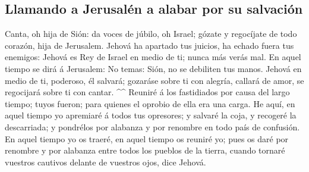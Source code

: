 \hypertarget{llamando-a-jerusaluxe9n-a-alabar-por-su-salvaciuxf3n}{%
\subsection{Llamando a Jerusalén a alabar por su
salvación}\label{llamando-a-jerusaluxe9n-a-alabar-por-su-salvaciuxf3n}}

 Canta, oh hija de Sión: da voces de júbilo, oh Israel;
gózate y regocíjate de todo corazón, hija de Jerusalem. 
Jehová ha apartado tus juicios, ha echado fuera tus enemigos: Jehová es
Rey de Israel en medio de ti; nunca más verás mal.  En
aquel tiempo se dirá á Jerusalem: No temas: Sión, no se debiliten tus
manos.  Jehová en medio de ti, poderoso, él salvará;
gozaráse sobre ti con alegría, callará de amor, se regocijará sobre ti
con cantar. \^{}\^{}  Reuniré á los fastidiados por causa
del largo tiempo; tuyos fueron; para quienes el oprobio de ella era una
carga.  He aquí, en aquel tiempo yo apremiaré á todos tus
opresores; y salvaré la coja, y recogeré la descarriada; y pondrélos por
alabanza y por renombre en todo país de confusión.  En
aquel tiempo yo os traeré, en aquel tiempo os reuniré yo; pues os daré
por renombre y por alabanza entre todos los pueblos de la tierra, cuando
tornaré vuestros cautivos delante de vuestros ojos, dice Jehová.

